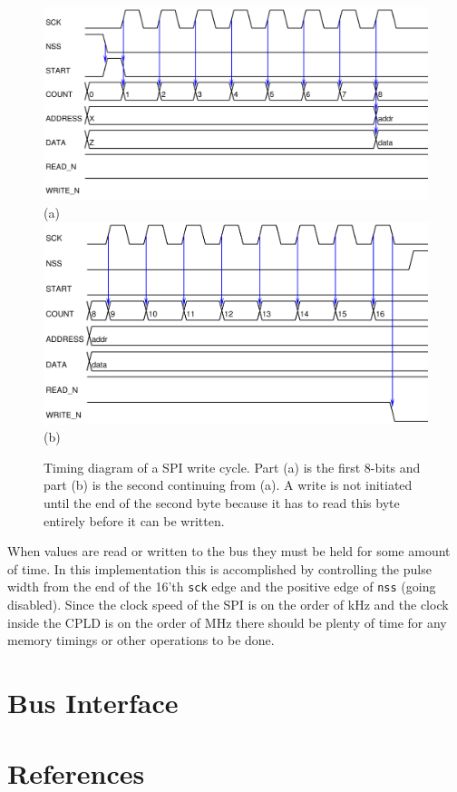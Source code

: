 \documentclass{article}
\begin{document}
\begin{figure}
\center
\includegraphics[scale=0.7]{figure/spi_ctl-timing/write-byte1} \\
(a) \\
\includegraphics[scale=0.7]{figure/spi_ctl-timing/write-byte2} \\
(b)
\caption{Timing diagram of a SPI write cycle.
Part (a) is the first 8-bits and part (b) is the second
continuing from (a).
A write is not initiated until the end of the
second byte because it has to read this byte entirely before it can be written.}
\label{fig:spi_write}
\end{figure}

When values are read or written to the bus they must be held for
some amount of time.
In this implementation this is accomplished by controlling the
pulse width from the end of the 16'th \verb+sck+ edge and the positive
edge of \verb+nss+ (going disabled).
Since the clock speed of the SPI is on the order of kHz and the
clock inside the CPLD is on the order of MHz there should be plenty
of time for any memory timings or other operations to be done.


\section{Bus Interface}


\clearpage

\pagebreak
\renewcommand*{\refname}{\vspace{-8mm}}
\section{References}
%


\end{document}
